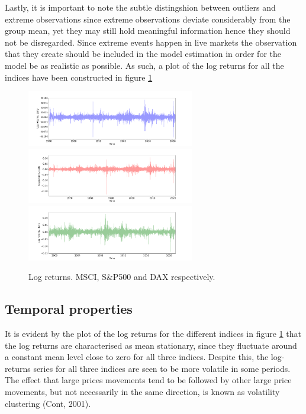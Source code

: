 Lastly, it is important to note the subtle distingshion between outliers and extreme observations since extreme observations deviate considerably from the group mean, yet they may still hold meaningful information hence they should not be disregarded.
Since extreme events happen in live markets the observation that they create should be included in the model estimation in order for the model be as realistic as possible. As such, a plot of the log returns for all the indices have been constructed in figure \ref{fig: log_returns_all_indices}

\begin{figure}[H] 
    \centering
    \includegraphics[width=0.65\textwidth]{analysis/data_description/images/MSCI_log_returns.png}
    \includegraphics[width=0.65\textwidth]{analysis/data_description/images/SP500_log_returns.png}
    \includegraphics[width=0.65\textwidth]{analysis/data_description/images/DAX_log_returns.png}
    \caption{Log returns. MSCI, S\&P500 and DAX respectively.}
    \label{fig: log_returns_all_indices}
\end{figure}


\label{subsection: distributional properties}

 
\subsection{Temporal properties}
\label{subsection: temporal properties}
It is evident by the plot of the log returns for the different indices in figure \ref{fig: log_returns_all_indices} that the log returns are characterised as mean stationary, since they fluctuate around a constant mean level close to zero for all three indices. Despite this, the log-returns series for all three indices are seen to be more volatile in some periods. The effect that large prices movements tend to be followed by other large price movements, but not necessarily in the same direction, is known as volatility clustering (Cont, 2001). 

